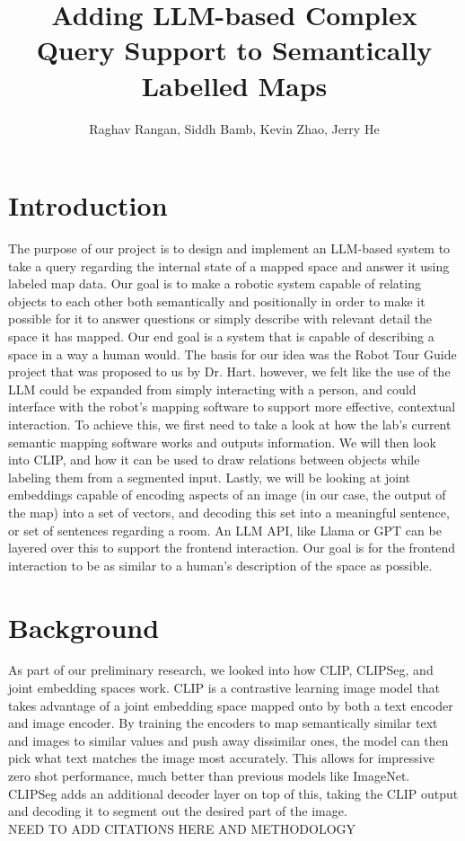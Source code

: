 \documentclass[letterpaper, 10 pt, conference]{ieeeconf}  %
\title{\LARGE \bf
Adding LLM-based Complex Query Support to Semantically Labelled Maps}
\author{Raghav Rangan, Siddh Bamb, Kevin Zhao, Jerry He%
}
\begin{document}
\maketitle
\thispagestyle{empty}
\pagestyle{empty}



\section{Introduction}
    The purpose of our project is to design and implement an LLM-based system to take a query regarding the internal state of a mapped space and answer it using labeled map data. Our goal is to make a robotic system capable of relating objects to each other both semantically and positionally in order to make it possible for it to answer questions or simply describe with relevant detail the space it has mapped. Our end goal is a system that is capable of describing a space in a way a human would.
    The basis for our idea was the Robot Tour Guide project that was proposed to us by Dr. Hart. however, we felt like the use of the LLM could be expanded from simply interacting with a person, and could interface with the robot's mapping software to support more effective, contextual interaction. To achieve this, we first need to take a look at how the lab's current semantic mapping software works and outputs information. We will then look into CLIP, and how it can be used to draw relations between objects while labeling them from a segmented input. Lastly, we will be looking at joint embeddings capable of encoding aspects of an image (in our case, the output of the map) into a set of vectors, and decoding this set into a meaningful sentence, or set of sentences regarding a room. An LLM API, like Llama or GPT can be layered over this to support the frontend interaction. Our goal is for the frontend interaction to be as similar to a human's description of the space as possible.

\section{Background}
    As part of our preliminary research, we looked into how CLIP, CLIPSeg, and joint embedding spaces work. CLIP is a contrastive learning image model that takes advantage of a joint embedding space mapped onto by both a text encoder and image encoder. By training the encoders to map semantically similar text and images to similar values and push away dissimilar ones, the model can then pick what text matches the image most accurately. This allows for impressive zero shot performance, much better than previous models like ImageNet. CLIPSeg adds an additional decoder layer on top of this, taking the CLIP output and decoding it to segment out the desired part of the image.
    \\
    NEED TO ADD CITATIONS HERE AND METHODOLOGY
\end{document}
